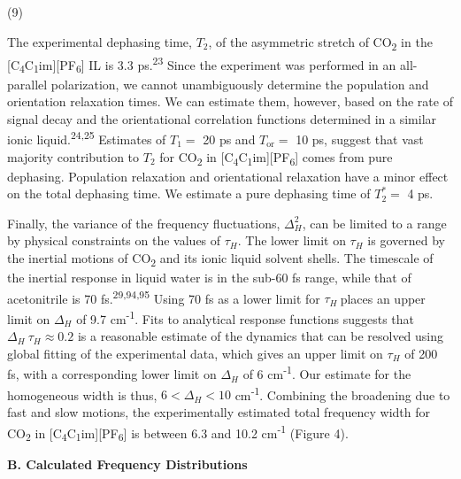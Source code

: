 \documentclass[]{article}
\begin{document}
(9)

The experimental dephasing time, \(T_{2}\), of the asymmetric stretch of
CO\textsubscript{2} in the
{[}C\textsubscript{4}C\textsubscript{1}im{]}{[}PF\textsubscript{6}{]} IL
is 3.3 ps.\textsuperscript{23} Since the experiment was performed in an
all-parallel polarization, we cannot unambiguously determine the
population and orientation relaxation times. We can estimate them,
however, based on the rate of signal decay and the orientational
correlation functions determined in a similar ionic
liquid.\textsuperscript{24,25} Estimates of \(T_{1} =\) 20 ps and
\(T_{\mathrm{\text{or}}} =\) 10 ps, suggest that vast majority
contribution to \(T_{2}\) for CO\textsubscript{2} in
{[}C\textsubscript{4}C\textsubscript{1}im{]}{[}PF\textsubscript{6}{]}
comes from pure dephasing. Population relaxation and orientational
relaxation have a minor effect on the total dephasing time. We estimate
a pure dephasing time of \(T_{2}^{*} =\) 4 ps.

Finally, the variance of the frequency fluctuations, \(\Delta_{H}^{2}\),
can be limited to a range by physical constraints on the values of
\(\tau_{H}\). The lower limit on \(\tau_{H}\) is governed by the
inertial motions of CO\textsubscript{2} and its ionic liquid solvent
shells. The timescale of the inertial response in liquid water is in the
sub-60 fs range, while that of acetonitrile is 70
fs.\textsuperscript{29,94,95} Using 70 fs as a lower limit for
\(\tau_{H}\ \)places an upper limit on \(\Delta_{H}\) of 9.7
cm\textsuperscript{-1}. Fits to analytical response functions suggests
that \(\Delta_{H}\ \tau_{H} \approx 0.2\) is a reasonable estimate of
the dynamics that can be resolved using global fitting of the
experimental data, which gives an upper limit on \(\tau_{H}\) of 200 fs,
with a corresponding lower limit on \(\Delta_{H}\) of 6
cm\textsuperscript{-1}. Our estimate for the homogeneous width is thus,
\(6 < \Delta_{H} < 10\) cm\textsuperscript{‑1}. Combining the broadening
due to fast and slow motions, the experimentally estimated total
frequency width for CO\textsubscript{2} in
{[}C\textsubscript{4}C\textsubscript{1}im{]}{[}PF\textsubscript{6}{]} is
between 6.3 and 10.2 cm\textsuperscript{-1} (Figure 4).

\textbf{B. Calculated Frequency Distributions}
\end{document}
